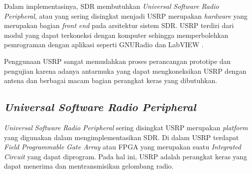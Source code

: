 Dalam implementasinya, SDR membutuhkan \textit{Universal Software Radio Peripheral}, atau yang sering disingkat menjadi USRP merupakan \textit{hardware} yang merupakan bagian \textit{front end} pada arsitektur sistem SDR. USRP terdiri dari modul yang dapat terkoneksi dengan komputer sehingga memperbolehkan pemrograman dengan aplikasi seperti GNURadio dan LabVIEW \cite{Gulo2023}. 

Penggunaan USRP sangat memudahkan proses perancangan prototipe dan pengujian karena adanya antarmuka yang dapat mengkoneksikan USRP dengan antena dan berbagai macam bagian perangkat keras yang dibutuhkan.

\subsection{\textit{Universal Software Radio Peripheral}}

\textit{Universal Software Radio Peripheral} sering disingkat USRP merupakan \textit{platform} yang digunakan dalam mengimplementasikan SDR. Di dalam USRP terdapat \textit{Field Programmable Gate Array} atau FPGA yang merupakan suatu \textit{Integrated Circuit} yang dapat diprogram. Pada hal ini, USRP adalah perangkat keras yang dapat menerima dan mentransmisikan gelombang radio.

